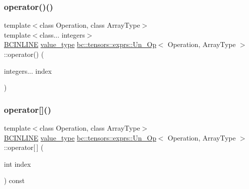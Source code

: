 \subsubsection{\texorpdfstring{operator()()}{operator()()}\hspace{0.1cm}{\footnotesize\ttfamily [2/2]}}
{\footnotesize\ttfamily template$<$class Operation, class Array\+Type$>$ \\
template$<$class... integers$>$ \\
\hyperlink{common_8h_a6699e8b0449da5c0fafb878e59c1d4b1}{B\+C\+I\+N\+L\+I\+NE} \hyperlink{structbc_1_1tensors_1_1exprs_1_1Un__Op_a8c87b36ec972937cd789e6517fb47369}{value\+\_\+type} \hyperlink{structbc_1_1tensors_1_1exprs_1_1Un__Op}{bc\+::tensors\+::exprs\+::\+Un\+\_\+\+Op}$<$ Operation, Array\+Type $>$\+::operator() (\begin{DoxyParamCaption}\item[{integers...}]{index }\end{DoxyParamCaption})\hspace{0.3cm}{\ttfamily [inline]}}

\mbox{\label{structbc_1_1tensors_1_1exprs_1_1Un__Op_a02a8c8bff37fe164c4e79079fc00a621}} 
\subsubsection{\texorpdfstring{operator[]()}{operator[]()}\hspace{0.1cm}{\footnotesize\ttfamily [1/2]}}
{\footnotesize\ttfamily template$<$class Operation, class Array\+Type$>$ \\
\hyperlink{common_8h_a6699e8b0449da5c0fafb878e59c1d4b1}{B\+C\+I\+N\+L\+I\+NE} \hyperlink{structbc_1_1tensors_1_1exprs_1_1Un__Op_a8c87b36ec972937cd789e6517fb47369}{value\+\_\+type} \hyperlink{structbc_1_1tensors_1_1exprs_1_1Un__Op}{bc\+::tensors\+::exprs\+::\+Un\+\_\+\+Op}$<$ Operation, Array\+Type $>$\+::operator\mbox{[}$\,$\mbox{]} (\begin{DoxyParamCaption}\item[{int}]{index }\end{DoxyParamCaption}) const\hspace{0.3cm}{\ttfamily [inline]}}

